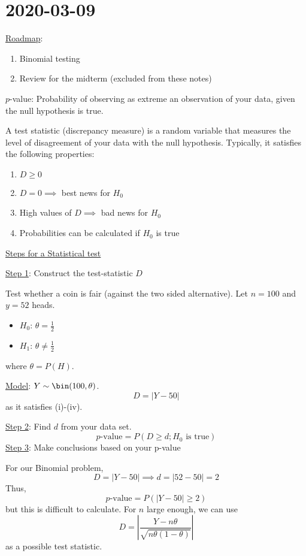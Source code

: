 \section{2020-03-09}
\underline{Roadmap}:
\begin{enumerate}[label=(\roman*)]
    \item Binomial testing
    \item Review for the midterm (excluded from these notes)
\end{enumerate}

\begin{Definition}{}{}
    $ p $-value: Probability of observing as extreme an observation of your data,
    given the null hypothesis is true.
\end{Definition}



\begin{Definition}{}{}
    A test statistic (discrepancy measure) is a random variable that measures
    the level of disagreement of your data with the null hypothesis. Typically,
    it satisfies the following properties:
    \begin{enumerate}[label=(\roman*)]
        \item $ D\geqslant 0 $
        \item $ D=0 \implies $ best news for $ H_0 $
        \item High values of $ D \implies $ bad news for $ H_0 $
        \item Probabilities can be calculated if $ H_0 $ is true
    \end{enumerate}
\end{Definition}


\underline{Steps for a Statistical test}

\underline{Step 1}: Construct the test-statistic $ D $

\begin{Example}{}{}
    Test whether a coin is fair (against the two sided alternative).
    Let $ n=100 $ and $ y=52 $ heads.
    \begin{itemize}
        \item $ H_0 $: $ \theta=\frac{1}{2} $
        \item $ H_1 $: $ \theta\neq \frac{1}{2} $
    \end{itemize}
    where $ \theta=P(H) $.

    \underline{Model}: $ Y \sim \bin(100,\theta) $.
    \[ D=|Y-50| \]
    as it satisfies (i)-(iv).
\end{Example}

\underline{Step 2}: Find $ d $ from your data set.
\[ p\text{-value}=P(D\geqslant d;H_0\text{ is true}) \]
\underline{Step 3}: Make conclusions based on your p-value

For our Binomial problem,
\[ D=|Y-50|\implies d=|52-50|=2 \]
Thus,
\[ p\text{-value}=P(|Y-50|\geqslant 2) \]
but this is difficult to calculate. For $ n $ large enough, we can use
\[ D=\left| \frac{Y-n\theta}{\sqrt{n\theta(1-\theta)}} \right| \]
as a possible test statistic.
